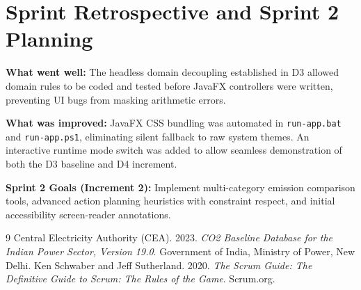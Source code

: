 \documentclass[12pt,a4paper]{article}
\newcommand{\code}[1]{\texttt{#1}}
\begin{document}
\section{Sprint Retrospective and Sprint 2 Planning}

\textbf{What went well:} The headless domain decoupling established in D3 allowed domain rules to be coded and tested before JavaFX controllers were written, preventing UI bugs from masking arithmetic errors.

\textbf{What was improved:} JavaFX CSS bundling was automated in \code{run-app.bat} and \code{run-app.ps1}, eliminating silent fallback to raw system themes. An interactive runtime mode switch was added to allow seamless demonstration of both the D3 baseline and D4 increment.

\textbf{Sprint 2 Goals (Increment 2):} Implement multi-category emission comparison tools, advanced action planning heuristics with constraint respect, and initial accessibility screen-reader annotations.

\begin{thebibliography}{9}
 Central Electricity Authority (CEA). 2023. \textit{CO2 Baseline Database for the Indian Power Sector, Version 19.0}. Government of India, Ministry of Power, New Delhi.
 Ken Schwaber and Jeff Sutherland. 2020. \textit{The Scrum Guide: The Definitive Guide to Scrum: The Rules of the Game}. Scrum.org.
\end{thebibliography}
\end{document}
